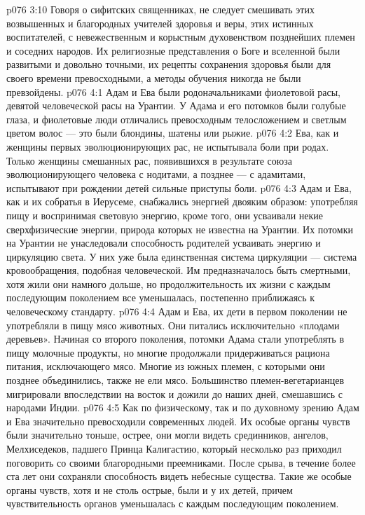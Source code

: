 \vs p076 3:10 Говоря о сифитских священниках, не следует смешивать этих возвышенных и благородных учителей здоровья и веры, этих истинных воспитателей, с невежественным и корыстным духовенством позднейших племен и соседних народов. Их религиозные представления о Боге и вселенной были развитыми и довольно точными, их рецепты сохранения здоровья были для своего времени превосходными, а методы обучения никогда не были превзойдены.
\vs p076 4:1 Адам и Ева были родоначальниками фиолетовой расы, девятой человеческой расы на Урантии. У Адама и его потомков были голубые глаза, и фиолетовые люди отличались превосходным телосложением и светлым цветом волос --- это были блондины, шатены или рыжие.
\vs p076 4:2 Ева, как и женщины первых эволюционирующих рас, не испытывала боли при родах. Только женщины смешанных рас, появившихся в результате союза эволюционирующего человека с нодитами, а позднее --- с адамитами, испытывают при рождении детей сильные приступы боли.
\vs p076 4:3 Адам и Ева, как и их собратья в Иерусеме, снабжались энергией двояким образом: употребляя пищу и воспринимая световую энергию, кроме того, они усваивали некие сверхфизические энергии, природа которых не известна на Урантии. Их потомки на Урантии не унаследовали способность родителей усваивать энергию и циркуляцию света. У них уже была единственная система циркуляции --- система кровообращения, подобная человеческой. Им предназначалось быть смертными, хотя жили они намного дольше, но продолжительность их жизни с каждым последующим поколением все уменьшалась, постепенно приближаясь к человеческому стандарту.
\vs p076 4:4 Адам и Ева, их дети в первом поколении не употребляли в пищу мясо животных. Они питались исключительно «плодами деревьев». Начиная со второго поколения, потомки Адама стали употреблять в пищу молочные продукты, но многие продолжали придерживаться рациона питания, исключающего мясо. Многие из южных племен, с которыми они позднее объединились, также не ели мясо. Большинство племен\hyp{}вегетарианцев мигрировали впоследствии на восток и дожили до наших дней, смешавшись с народами Индии.
\vs p076 4:5 Как по физическому, так и по духовному зрению Адам и Ева значительно превосходили современных людей. Их особые органы чувств были значительно тоньше, острее, они могли видеть срединников, ангелов, Мелхиседеков, падшего Принца Калигастию, который несколько раз приходил поговорить со своими благородными преемниками. После срыва, в течение более ста лет они сохраняли способность видеть небесные существа. Такие же особые органы чувств, хотя и не столь острые, были и у их детей, причем чувствительность органов уменьшалась с каждым последующим поколением.
